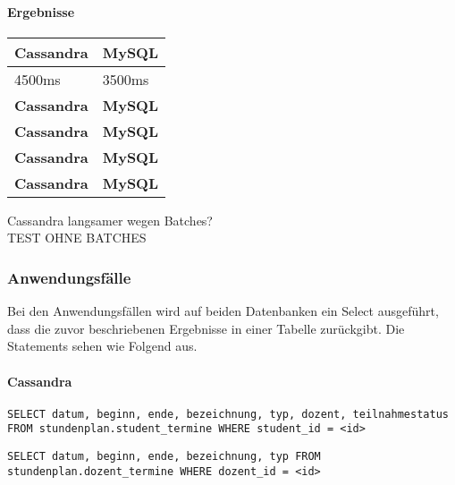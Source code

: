 \paragraph{Ergebnisse}
\begin{tabular}{|p{5cm}|p{5cm}|}
	\hline
	\textbf{Cassandra} & \textbf{MySQL}\\
	\hline
	4500ms & 3500ms\\
	\hline
	\textbf{Cassandra} & \textbf{MySQL}\\
	\hline
	\textbf{Cassandra} & \textbf{MySQL}\\
	\hline
	\textbf{Cassandra} & \textbf{MySQL}\\
	\hline
	\textbf{Cassandra} & \textbf{MySQL}\\
	\hline
\end{tabular}

Cassandra langsamer wegen Batches?\\
TEST OHNE BATCHES

\newpage

\subsubsection{Anwendungsfälle}
Bei den Anwendungsfällen wird auf beiden Datenbanken ein Select ausgeführt, dass die zuvor beschriebenen Ergebnisse in einer Tabelle zurückgibt. Die Statements sehen wie Folgend aus.

\vspace{6pt}

\paragraph{Cassandra}
\begin{lstlisting}
SELECT datum, beginn, ende, bezeichnung, typ, dozent, teilnahmestatus FROM stundenplan.student_termine WHERE student_id = <id>
\end{lstlisting} 
\begin{lstlisting}
SELECT datum, beginn, ende, bezeichnung, typ FROM stundenplan.dozent_termine WHERE dozent_id = <id>
\end{lstlisting} 

\vspace{6pt}

